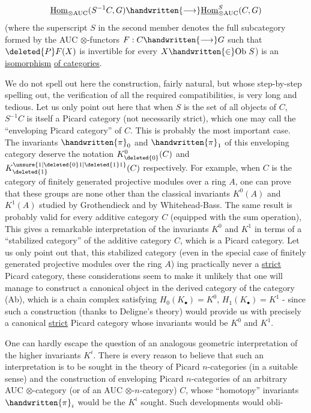 \[
\underline{\mathrm{Hom}}_{\otimes\mathrm{AUC}}(S^{-1}C,G)\handwritten{\longrightarrow}\underline{\mathrm{Hom}}_{\otimes\mathrm{AUC}}^{S}(C,G)
\]
(where the superscript $S$ in the second member denotes the full subcategory formed by the AUC $\otimes$-functors $F:C\handwritten{\longrightarrow}G$ such that $\deleted{P}F(X)$ is invertib\unsure{\textperiodcentered|-}le for every $X\handwritten{\in}\mathrm{Ob}\ S$) is an \uline{isomorphism} \uline{of categories}.

We do not spell out here the construction, fairly natural, but whose step-by-step spelling out,  the verification of all the required compatibilities, is very long and tedious. Let us only point out here that when $S$ is the set of all objects of $C$, $S^{-1}C$ is itself a Picard category (not necessarily strict), which one may call the ``enveloping Picard category'' of $C$. This is probably the most important case. The invariants $\handwritten{\pi}_{0}$ and $\handwritten{\pi}_{1}$ of this enveloping category deserve the notation $K^{0}_{\deleted{0}}(C)$ and $K^{\unsure{1|\deleted{0}1|\deleted{1}1}}_{\deleted{1}}(C)$ respectively. For example, when $C$ is the category of finitely generated projective modules over a ring $A$,  one can prove that these groups are none other than the classical invariants $K^{0}(A)$ and $K^{1}(A)$ studied by Grothendieck and by Whitehead-Bass. The same result is probably valid for every additive category $C$ (equipped with  the sum operation), This gives a remarkable interpretation of the invariants $K^{0}$ and $K^{1}$ in terms of a ``stabilized category'' \handwritten{(}of the additive category $C$\handwritten{)}, which is a Picard category. Let us only point out that, this stabilized category (even in the special case of finitely generated projective modules over the ring $A$) ing practically never a \uline{strict} Picard category, these considerations seem to make it unlikely that one will manage to construct a canonical object in the derived category of the category (Ab), which is a chain complex satisfying $H_{0}(K_{\bullet})=K^{0}$, $H_{1}(K_{\bullet})=K^{1}$ - since such a construction (thanks to Deligne's theory) would provide us with precisely a canonical \uline{strict} Picard category whose invariants would be $K^{0}$ and $K^{1}$.

One can hardly escape the question of an analogous geometric interpretation of the higher invariants $K^{i}$. There is every reason to believe that such an interpretation is to be sought in the theory of Picard $n$-categories (in a suitable sense) and the construction of enveloping Picard $n$-categories of an arbitrary AUC $\otimes$-category (or of an AUC $\otimes$-$n$-category) $C$, whose ``homotopy'' invariants $\handwritten{\pi}_{i}$ would be the $K^{i}$ sought. Such developments would obli-

